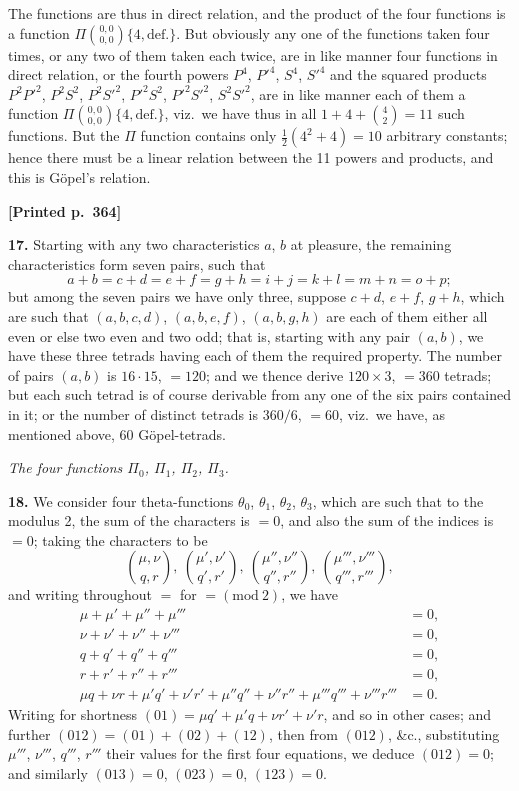 \documentclass[11pt]{article}
\providecommand{\modd}{\mathrm{mod}}
\begin{document}
The functions are thus in direct relation, and the product of the four functions is a function $\Pi\binom{0,0}{0,0}\{4,\text{def.}\}$. But obviously any one of the functions taken four times, or any two of them taken each twice, are in like manner four functions in direct relation, or the fourth powers $P^{4}$, $P'^{4}$, $S^{4}$, $S'^{4}$ and the squared products $P^{2}P'^{2}$, $P^{2}S^{2}$, $P^{2}S'^{2}$, $P'^{2}S^{2}$, $P'^{2}S'^{2}$, $S^{2}S'^{2}$, are in like manner each of them a function $\Pi\binom{0,0}{0,0}\{4,\text{def.}\}$, viz.\ we have thus in all $1+4+\binom{4}{2}=11$ such functions. But the $\Pi$ function contains only $\tfrac{1}{2}(4^{2}+4)=10$ arbitrary constants; hence there must be a linear relation between the 11 powers and products, and this is G\"opel's relation.

\medskip
\noindent\textbf{[Printed p.~364]}\hfill

\medskip
\noindent\textbf{17.} Starting with any two characteristics $a$, $b$ at pleasure, the remaining characteristics form seven pairs, such that
\[
a+b=c+d=e+f=g+h=i+j=k+l=m+n=o+p;
\]
but among the seven pairs we have only three, suppose $c+d$, $e+f$, $g+h$, which are such that $(a,b,c,d)$, $(a,b,e,f)$, $(a,b,g,h)$ are each of them either all even or else two even and two odd; that is, starting with any pair $(a,b)$, we have these three tetrads having each of them the required property. The number of pairs $(a,b)$ is $16\cdot 15$, $=120$; and we thence derive $120\times 3$, $=360$ tetrads; but each such tetrad is of course derivable from any one of the six pairs contained in it; or the number of distinct tetrads is $360/6$, $=60$, viz.\ we have, as mentioned above, 60 G\"opel-tetrads.

\medskip
\begin{center}\textit{The four functions $\Pi_{0}$, $\Pi_{1}$, $\Pi_{2}$, $\Pi_{3}$.}\end{center}

\noindent\textbf{18.} We consider four theta-functions $\theta_{0}$, $\theta_{1}$, $\theta_{2}$, $\theta_{3}$, which are such that to the modulus 2, the sum of the characters is $=0$, and also the sum of the indices is $=0$; taking the characters to be
\[
\binom{\mu,\nu}{q,r},\ \binom{\mu',\nu'}{q',r'},\ \binom{\mu'',\nu''}{q'',r''},\ \binom{\mu''',\nu'''}{q''',r'''},
\]
and writing throughout $=$ for $=(\modd\ 2)$, we have
\begin{align*}
\mu+\mu'+\mu''+\mu''' &= 0,\\
\nu+\nu'+\nu''+\nu''' &= 0,\\
q+q'+q''+q''' &= 0,\\
r+r'+r''+r''' &= 0,\\
\mu q+\nu r+\mu' q'+\nu' r'+\mu'' q''+\nu'' r''+\mu''' q'''+\nu''' r''' &= 0.
\end{align*}
Writing for shortness $(01)=\mu q'+\mu' q+\nu r'+\nu' r$, and so in other cases; and further $(012)=(01)+(02)+(12)$, then from $(012)$, \&c., substituting $\mu'''$, $\nu'''$, $q'''$, $r'''$ their values for the first four equations, we deduce $(012)=0$; and similarly $(013)=0$, $(023)=0$, $(123)=0$.
\end{document}
